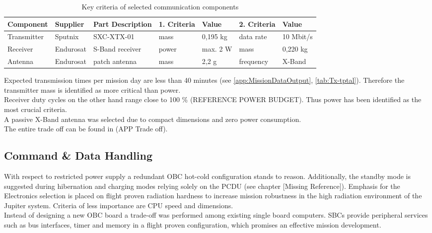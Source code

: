 \begin{table}[h]
\centering
\caption{Key criteria of selected communication components}
\begin{tabular}{lll|ll|ll}
\toprule
Component   & Supplier  & Part Description     & 1. Criteria   & Value    & 2. Criteria & Value          \\
\midrule
Transmitter & Sputnix   & SXC-XTX-01           & mass          & 0,195 kg & data rate   & 10 Mbit/s \\
Receiver    & Endurosat & S-Band receiver      & power         & max. 2 W & mass        & 0,220 kg       \\
Antenna     & Endurosat & patch antenna & mass          & 2,2 g    & frequency   & X-Band         \\
\bottomrule
\end{tabular}
\label{tab:ComCompComp}
\end{table}

Expected transmission times per mission day are less than 40 minutes (see \autoref{app:MissionDataOutput}, \autoref{tab:Tx-tptal}). Therefore the transmitter mass is identified as more critical than power. \\
Receiver duty cycles on the other hand range close to 100 \% (REFERENCE POWER BUDGET). Thus power has been identified as the most crucial criteria. \\
A passive X-Band antenna was selected due to compact dimensions and zero power consumption.  \\
The entire trade off can be found in (APP Trade off).

 \subsection{Command \& Data Handling}
 
 With respect to restricted power supply a redundant OBC hot-cold configuration stands to reason. Additionally, the standby mode is suggested during hibernation and charging modes relying solely on the PCDU (see chapter [Missing Reference]). 
Emphasis for the Electronics selection is placed on flight proven radiation hardness to increase mission robustness in the high radiation environment of the Jupiter system. 
Criteria of less importance are CPU speed and dimensions. \\

Instead of designing a new OBC board a trade-off was performed among existing single board computers. SBCs provide peripheral services such as bus interfaces, timer and memory in a flight proven configuration, which promises an effective mission development. \\

